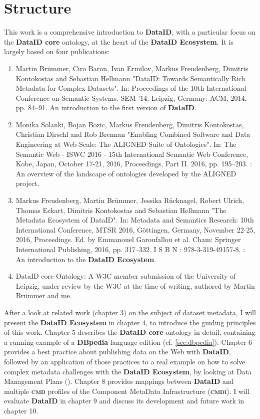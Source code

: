 \documentclass[a4paper,english,twoside,BCOR1.5cm,headsepline,DIV12,appendixprefix,final,12pt]{scrbook}
\newcommand{\ecosystem}{{\ttfamily\bfseries DataID Ecosystem}\xspace}
\newcommand{\dataid}{{\ttfamily\bfseries DataID}\xspace}
\newcommand{\core}{{\ttfamily\bfseries DataID core}\xspace}
\newcommand{\cmdi}{{\scshape\bfseries cmdi}\xspace}
\newcommand{\cmd}{{\scshape\bfseries cmd}\xspace}
\newcommand{\dbpedia}{{\ttfamily\bfseries DBpedia}\xspace}
\begin{document}
\section{Structure}
\label{sec:structure}
This work is a comprehensive introduction to \dataid, with a particular focus on the \core ontology, at the heart of the \ecosystem. It is largely based on four publications:
\begin{enumerate}
\item Martin Brümmer, Ciro Baron, Ivan Ermilov, Markus Freudenberg, Dimitris Kontokostas and Sebastian Hellmann  "DataID: Towards Semantically Rich Metadata for
Complex Datasets". In: Proceedings of the 10th International Conference on
Semantic Systems. SEM ’14. Leipzig, Germany: ACM, 2014, pp. 84–91. \cite{dataID2014}
An introduction to the first version of \dataid.
\item Monika Solanki, Bojan Bozic, Markus Freudenberg, Dimitris Kontokostas, Christian Dirschl and Rob Brennan "Enabling Combined Software and Data Engineering
at Web-Scale: The ALIGNED Suite of Ontologies". In: The Semantic Web -
ISWC 2016 - 15th International Semantic Web Conference, Kobe, Japan, October
17-21, 2016, Proceedings, Part II. 2016, pp. 195–203. \cite{SolankiBFKDB16}: An overview of the landscape of ontologies developed by the ALIGNED project.
\item Markus Freudenberg, Martin Br{\"u}mmer, Jessika R{\"u}cknagel, Robert Ulrich, Thomas Eckart, Dimitris Kontokostas and Sebastian Hellmann "The Metadata Ecosystem of DataID". In: Metadata and Semantics Research: 10th International Conference, MTSR 2016, Göttingen, Germany, November 22-25, 2016, Proceedings. Ed. by Emmanouel
Garoufallou et al. Cham: Springer International Publishing, 2016, pp. 317–332. I S B N : 978-3-319-49157-8. \cite{Freudenberg2016}: An introduction to the \ecosystem.
\item DataID core Ontology: A W3C member submission of the University of Leipzig, under review by the W3C at the time of writing, authored by Martin Brümmer and me.
\end{enumerate}

After a look at related work (chapter 3) on the subject of dataset metadata, I will present the \ecosystem in chapter 4, to introduce the guiding principles of this work. Chapter 5 describes the \core ontology in detail, containing a running example of a 
\dbpedia language edition (cf. \cref{sec:dbpedia}). 
Chapter 6 provides a best practice about publishing data on the Web with \dataid, followed by an application of those practices to a real example on how to solve complex metadata challenges with the \ecosystem, by looking at Data Management Plans ().
Chapter 8 provides mappings between \dataid and multiple \cmd profiles of the Component MetaData Infrastructure (\cmdi). I will evaluate \dataid in chapter 9 and discuss its development and future work in chapter 10. 
\end{document}
